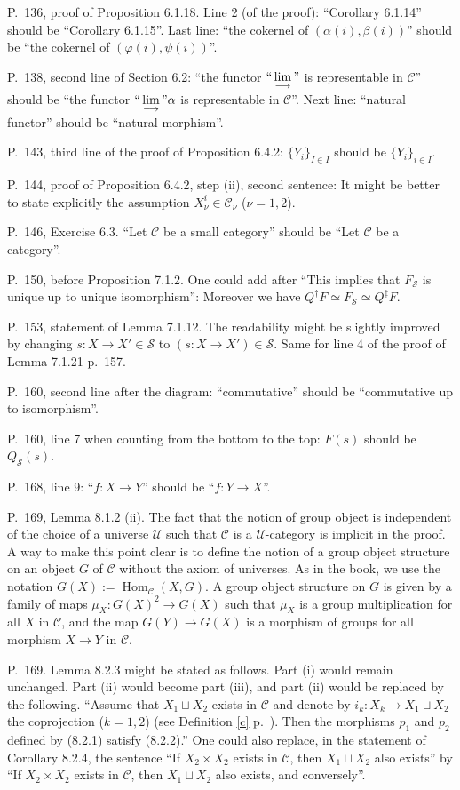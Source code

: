 \documentclass[12pt]{article}
\theoremstyle{remark}%
\newcommand{\n}{\noindent}
\newcommand{\C}{\mathcal C}
\newcommand{\SSS}{\mathcal S}
\newcommand{\U}{\mathcal U}
\newcommand{\p}{\varphi}
\DeclareMathOperator{\Hom}{Hom}
\begin{document}
\n P.~136, proof of Proposition 6.1.18. Line 2 (of the proof): ``Corollary 6.1.14'' should be ``Corollary 6.1.15''. Last line: ``the cokernel of $(\alpha(i),\beta(i))$'' should be ``the cokernel of $(\p(i),\psi(i))$''. 

\n P.~138, second line of Section 6.2: ``the functor $``\displaystyle\lim_{\longrightarrow}"$ is representable in $\C$'' should be ``the functor $``\displaystyle\lim_{\longrightarrow}"\alpha$ is representable in $\C$''. Next line: ``natural functor'' should be ``natural morphism''. 

\n P.~143, third line of the proof of Proposition 6.4.2: $\{Y_i\}_{I\in I}$ should be $\{Y_i\}_{i\in I}$. 

\n P.~144, proof of Proposition 6.4.2, step (ii), second sentence: It might be better to state explicitly the assumption $X_\nu^i\in\C_\nu$ ($\nu=1,2$). 

\n P.~146, Exercise 6.3. ``Let $\C$ be a small category'' should be ``Let $\C$ be a category''. 

\n P.~150, before Proposition 7.1.2. One could add after ``This implies that $F_{\SSS}$ is unique up to unique isomorphism'': Moreover we have $Q^\dagger F\simeq F_{\SSS}\simeq Q^\ddagger F$. 

\n P.~153, statement of Lemma 7.1.12. The readability might be slightly improved by changing $s:X\to X'\in\mathcal S$ to $(s:X\to X')\in\mathcal S$. Same for line 4 of the proof of Lemma 7.1.21 p.~157.  

\n P.~160, second line after the diagram: ``commutative'' should be ``commutative up to isomorphism''.

\n P.~160, line 7 when counting from the bottom to the top: $F(s)$ should be $Q_{\mathcal S}(s)$. 

\n P.~168, line 9: ``$f:X\to Y$'' should be ``$f:Y\to X$''. 

\n P.~169, Lemma 8.1.2 (ii). The fact that the notion of group object is independent of the choice of a universe $\U$ such that $\C$ is a $\U$-category is implicit in the proof. A way to make this point clear is to define the notion of a group object structure on an object $G$ of $\C$ without the axiom of universes. As in the book, we use the notation $G(X):=\Hom_\C(X,G)$. A group object structure on $G$ is given by a family of maps $\mu_X:G(X)^2\to G(X)$ such that $\mu_X$ is a group multiplication for all $X$ in $\C$, and the map $G(Y)\to G(X)$ is a morphism of groups for all morphism $X\to Y$ in $\C$. 

\n P.~169. Lemma 8.2.3 might be stated as follows. Part (i) would remain unchanged. Part (ii) would become part (iii), and part (ii) would be replaced by the following. ``Assume that $X_1\sqcup X_2$ exists in $\C$ and denote by $i_k:X_k\to X_1\sqcup X_2$ the coprojection ($k=1,2$) (see Definition \ref{c} p.~\pageref{c}). Then the morphisms $p_1$ and $p_2$ defined by (8.2.1) satisfy (8.2.2).'' One could also replace, in the statement of Corollary 8.2.4, the sentence ``If $X_2\times X_2$ exists in $\C$, then $X_1\sqcup X_2$ also exists'' by ``If $X_2\times X_2$ exists in $\C$, then $X_1\sqcup X_2$ also exists, and conversely''. 
\end{document}
